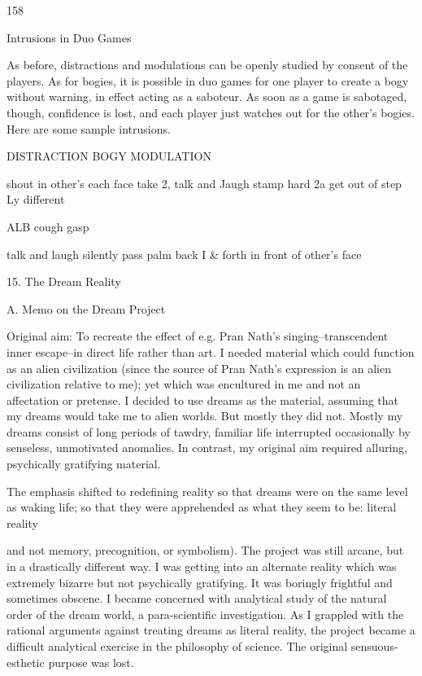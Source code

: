 \documentclass[10pt,twoside]{memoir}
\begin{document}
\begin{enumerate}
{\begin{enumerate}
\begin{sysrules}
\begin{sysrules}
\begin{sysrules}
\begin{sysrules}
{\begin{enumerate}
{{{{{{158 


Intrusions in Duo Games 

As before, distractions and modulations can be openly studied by 
consent of the players. As for bogies, it is possible in duo games for one 
player to create a bogy without warning, in effect acting as a saboteur. As 
soon as a game is sabotaged, though, confidence is lost, and each player just 
watches out for the other's bogies. Here are some sample intrusions. 


DISTRACTION BOGY MODULATION 


shout in other's each 
face take 
2, talk and Jaugh stamp hard 2a 
get out of step Ly different 


} 


ALB cough gasp 


talk and laugh silently pass palm back I 
& forth in front of 
other's face 


15. The Dream Reality 


A. Memo on the Dream Project 


Original aim: To recreate the effect of e.g. Pran Nath's singing--transcendent 
inner escape--in direct life rather than art. I needed material which could 
function as an alien civilization (since the source of Pran Nath's expression is 
an alien civilization relative to me); yet which was encultured in me and not 
an affectation or pretense. I decided to use dreams as the material, assuming 
that my dreams would take me to alien worlds. But mostly they did not. 
Mostly my dreams consist of long periods of tawdry, familiar life interrupted 
occasionally by senseless, unmotivated anomalies. In contrast, my original 
aim required alluring, psychically gratifying material. 


The emphasis shifted to redefining reality so that dreams were on the same 
level as waking life; so that they were apprehended as what they seem to be: 
literal reality {and not memory, precognition, or symbolism). The project 
was still arcane, but in a drastically different way. I was getting into an 
alternate reality which was extremely bizarre but not psychically gratifying. 
It was boringly frightful and sometimes obscene. I became concerned with 
analytical study of the natural order of the dream world, a para-scientific 
investigation. As I grappled with the rational arguments against treating 
dreams as literal reality, the project became a difficult analytical exercise in 
the philosophy of science. The original sensuous-esthetic purpose was lost. 


}}}}}}
\end{enumerate}}
\end{sysrules}
\end{sysrules}
\end{sysrules}
\end{sysrules}
\end{enumerate}}
\end{enumerate}
\end{document}
